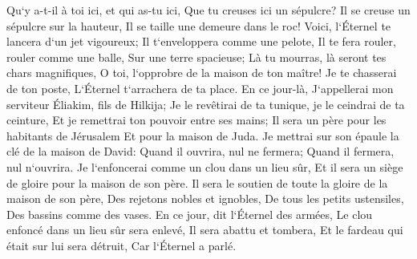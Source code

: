 \verse Qu`y a-t-il à toi ici, et qui as-tu ici, Que tu creuses ici un sépulcre? Il se creuse un sépulcre sur la hauteur, Il se taille une demeure dans le roc! 
\verse Voici, l`Éternel te lancera d`un jet vigoureux; Il t`enveloppera comme une pelote, 
\verse Il te fera rouler, rouler comme une balle, Sur une terre spacieuse; Là tu mourras, là seront tes chars magnifiques, O toi, l`opprobre de la maison de ton maître! 
\verse Je te chasserai de ton poste, L`Éternel t`arrachera de ta place. 
\verse En ce jour-là, J`appellerai mon serviteur Éliakim, fils de Hilkija; 
\verse Je le revêtirai de ta tunique, je le ceindrai de ta ceinture, Et je remettrai ton pouvoir entre ses mains; Il sera un père pour les habitants de Jérusalem Et pour la maison de Juda. 
\verse Je mettrai sur son épaule la clé de la maison de David: Quand il ouvrira, nul ne fermera; Quand il fermera, nul n`ouvrira. 
\verse Je l`enfoncerai comme un clou dans un lieu sûr, Et il sera un siège de gloire pour la maison de son père. 
\verse Il sera le soutien de toute la gloire de la maison de son père, Des rejetons nobles et ignobles, De tous les petits ustensiles, Des bassins comme des vases. 
\verse En ce jour, dit l`Éternel des armées, Le clou enfoncé dans un lieu sûr sera enlevé, Il sera abattu et tombera, Et le fardeau qui était sur lui sera détruit, Car l`Éternel a parlé. 

